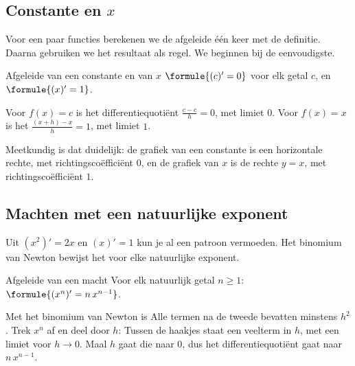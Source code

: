 \begin{oefeningen}
\end{oefeningen}

\subsection{Constante en \texorpdfstring{$x$}{x}}

Voor een paar functies berekenen we de afgeleide één keer met de definitie. Daarna gebruiken we het resultaat als regel. We beginnen bij de eenvoudigste.

\begin{theorie}
\begin{stelling}{Afgeleide van een constante en van \texorpdfstring{$x$}{x}}
$\formule{(c)' = 0}$ voor elk getal $c$, \qquad en \qquad $\formule{(x)' = 1}$.
\end{stelling}
\begin{bewijs}
Voor $f(x) = c$ is het differentiequotiënt $\frac{c - c}{h} = 0$, met limiet $0$. Voor $f(x) = x$ is het $\frac{(x + h) - x}{h} = 1$, met limiet $1$.
\end{bewijs}
\end{theorie}

Meetkundig is dat duidelijk: de grafiek van een constante is een horizontale rechte, met richtingscoëfficiënt $0$, en de grafiek van $x$ is de rechte $y = x$, met richtingscoëfficiënt $1$.

\subsection{Machten met een natuurlijke exponent}

Uit $(x^2)' = 2x$ en $(x)' = 1$ kun je al een patroon vermoeden. Het binomium van Newton bewijst het voor elke natuurlijke exponent.

\begin{theorie}
\begin{stelling}{Afgeleide van een macht}
Voor elk natuurlijk getal $n \geqslant 1$: \quad $\formule{(x^n)' = n\,x^{n - 1}}$.
\end{stelling}
\begin{bewijs}
Met het binomium van Newton is
Alle termen na de tweede bevatten minstens $h^2$. Trek $x^n$ af en deel door $h$:
Tussen de haakjes staat een veelterm in $h$, met een limiet voor $h \to 0$. Maal $h$ gaat die naar $0$, dus het differentiequotiënt gaat naar $n\,x^{n-1}$.
\end{bewijs}
\end{theorie}

